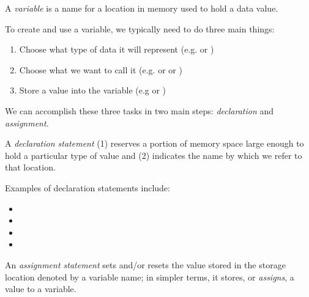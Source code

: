 \begin{definition}
A \emph{variable} is a name for a location in memory used to hold a data value.
\end{definition}

\noindent To create and use a variable, we typically need to do three main things:
\begin{enumerate}
 \item Choose what type of data it will represent (e.g.  or )
 \item Choose what we want to call it (e.g.  or  or )
 \item Store a value into the variable (e.g  or )
\end{enumerate}
We can accomplish these three tasks in two main steps: \emph{declaration} and \emph{assignment}.

\begin{definition}
A \emph{declaration statement} (1) reserves a portion of memory space large enough to hold a particular type of value and (2) indicates the name by which we refer to that location.
\end{definition}

\noindent Examples of declaration statements include:
\begin{itemize}
 \item {}
 \item {}
 \item {}
 \item {}
\end{itemize}

\begin{definition}
An \emph{assignment statement} sets and/or resets the value stored in the storage location denoted by a variable name; in simpler terms, it stores, or \emph{assigns}, a value to a variable.
\end{definition}


